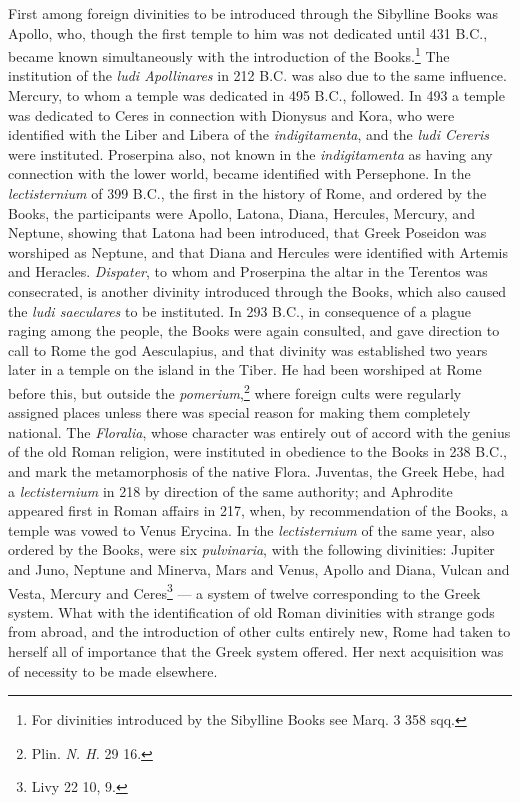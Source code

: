\documentclass[a4paper, 11pt, oneside, polutonikogreek, english]{article}
\begin{document}
First among foreign divinities to be introduced through the Sibylline Books was Apollo, who, though the first temple to him was not dedicated until 431 \textsc{B.C.}, became known simultaneously with the introduction of the Books.\footnote{For divinities introduced by the Sibylline Books see Marq. 3 358 sqq.} The institution of the \emph{ludi Apollinares} in 212 \textsc{B.C.} was also due to the same influence. Mercury, to whom a temple was dedicated in 495 \textsc{B.C.}, followed. In 493 a temple was dedicated to Ceres in connection with Dionysus and Kora, who were identified with the Liber and Libera of the \emph{indigitamenta}, and the \emph{ludi Cereris} were instituted. Proserpina also, not known in the \emph{indigitamenta} as having any connection with the lower world, became identified with Persephone. In the \emph{lectisternium} of 399 \textsc{B.C.}, the first in the history of Rome, and ordered by the Books, the participants were Apollo, Latona, Diana, Hercules, Mercury, and Neptune, showing that Latona had been introduced, that Greek Poseidon was worshiped as Neptune, and that Diana and Hercules were identified with Artemis and Heracles. \emph{Dispater}, to whom and Proserpina the altar in the Terentos was consecrated, is another divinity introduced through the Books, which also caused the \emph{ludi saeculares} to be instituted. In 293 \textsc{B.C.}, in consequence of a plague raging among the people, the Books were again consulted, and gave direction to call to Rome the god Aesculapius, and that divinity was established two years later in a temple on the island in the Tiber. He had been worshiped at Rome before this, but outside the \emph{pomerium},\footnote{Plin. \emph{N. H.} 29 16.} where foreign cults were regularly assigned places unless there was special reason for making them completely national. The \emph{Floralia}, whose character was entirely out of accord with the genius of the old Roman religion, were instituted in obedience to the Books in 238 \textsc{B.C.}, and mark the metamorphosis of the native Flora. Juventas, the Greek Hebe, had a \emph{lectisternium} in 218 by direction of the same authority; and Aphrodite appeared first in Roman affairs in 217, when, by recommendation of the Books, a temple was vowed to Venus Erycina. In the \emph{lectisternium} of the same year, also ordered by the Books, were six \emph{pulvinaria}, with the following divinities: Jupiter and Juno, Neptune and Minerva, Mars and Venus, Apollo and Diana, Vulcan and Vesta, Mercury and Ceres\footnote{Livy 22 10, 9.} --- a system of twelve corresponding to the Greek system. What with the identification of old Roman divinities with strange gods from abroad, and the introduction of other cults entirely new, Rome had taken to herself all of importance that the Greek system offered. Her next acquisition was of necessity to be made elsewhere.
\end{document}
